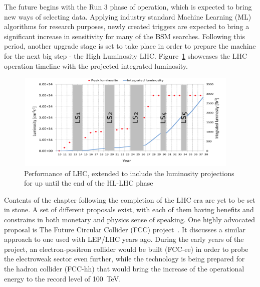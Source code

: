 \hspace{10pt} The future begins with the Run 3 phase of operation, which is expected to bring new ways of selecting data. Applying industry standard Machine Learning (ML) algorithms for research purposes, newly created triggers are expected to bring a significant increase in sensitivity for many of the BSM searches. Following this period, another upgrade stage is set to take place in order to prepare the machine for the next big step - the High Luminosity LHC. Figure~\ref{fig:lhc} showcases the LHC operation timeline with the projected integrated luminosity. 

\begin{figure}[htbp]
  \centering
    \includegraphics[width=0.95\textwidth]{CMS_experiment/LHC_integrated_lumi.png}
  \caption[Performance of LHC, extended to include the luminosity projections for up until the end of the HL-LHC phase.]{Performance of LHC, extended to include the luminosity projections for up until the end of the HL-LHC phase~\cite{ref:Schmidt_2016}}
  \label{fig:lhc}
\end{figure}


\hspace{10pt} Contents of the chapter following the completion of the LHC era are yet to be set in stone. A set of different proposals exist, with each of them having benefits and constrains in both monetary and physics sense of speaking. One highly advocated proposal is The Future Circular Collider (FCC) project~\cite{FCC_CDR}. It discusses a similar approach to one used with LEP/LHC years ago. During the early years of the project, an electron-positron collider would be built (FCC-ee) in order to probe the electroweak sector even further, while the technology is being prepared for the hadron collider (FCC-hh) that would bring the increase of the operational energy to the record level of 100~TeV. 



